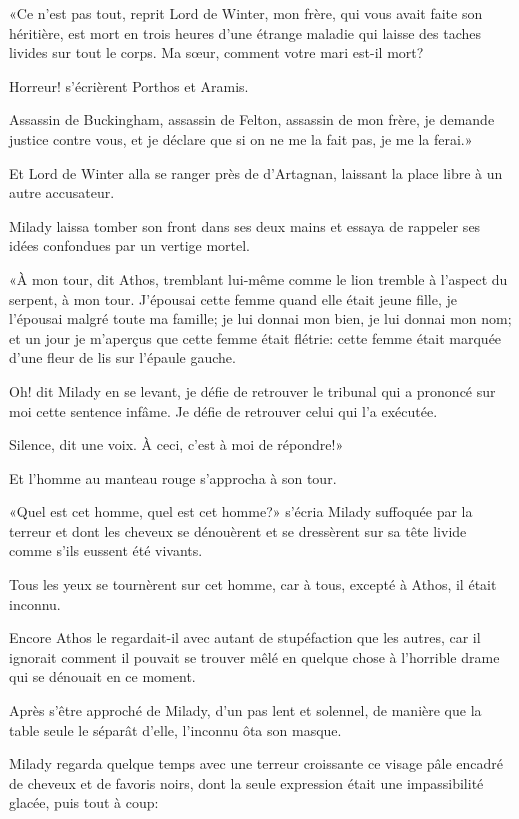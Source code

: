 «Ce n'est pas tout, reprit Lord de Winter, mon frère, qui vous avait faite son héritière, est mort en trois heures d'une étrange maladie qui laisse des taches livides sur tout le corps. Ma sœur, comment votre mari est-il mort? 

\speak  Horreur! s'écrièrent Porthos et Aramis. 

\speak  Assassin de Buckingham, assassin de Felton, assassin de mon frère, je demande justice contre vous, et je déclare que si on ne me la fait pas, je me la ferai.» 

Et Lord de Winter alla se ranger près de d'Artagnan, laissant la place libre à un autre accusateur. 

Milady laissa tomber son front dans ses deux mains et essaya de rappeler ses idées confondues par un vertige mortel. 

«À mon tour, dit Athos, tremblant lui-même comme le lion tremble à l'aspect du serpent, à mon tour. J'épousai cette femme quand elle était jeune fille, je l'épousai malgré toute ma famille; je lui donnai mon bien, je lui donnai mon nom; et un jour je m'aperçus que cette femme était flétrie: cette femme était marquée d'une fleur de lis sur l'épaule gauche. 

\speak  Oh! dit Milady en se levant, je défie de retrouver le tribunal qui a prononcé sur moi cette sentence infâme. Je défie de retrouver celui qui l'a exécutée. 

\speak  Silence, dit une voix. À ceci, c'est à moi de répondre!» 

Et l'homme au manteau rouge s'approcha à son tour. 

«Quel est cet homme, quel est cet homme?» s'écria Milady suffoquée par la terreur et dont les cheveux se dénouèrent et se dressèrent sur sa tête livide comme s'ils eussent été vivants. 

Tous les yeux se tournèrent sur cet homme, car à tous, excepté à Athos, il était inconnu. 

Encore Athos le regardait-il avec autant de stupéfaction que les autres, car il ignorait comment il pouvait se trouver mêlé en quelque chose à l'horrible drame qui se dénouait en ce moment. 

Après s'être approché de Milady, d'un pas lent et solennel, de manière que la table seule le séparât d'elle, l'inconnu ôta son masque. 

Milady regarda quelque temps avec une terreur croissante ce visage pâle encadré de cheveux et de favoris noirs, dont la seule expression était une impassibilité glacée, puis tout à coup: 

